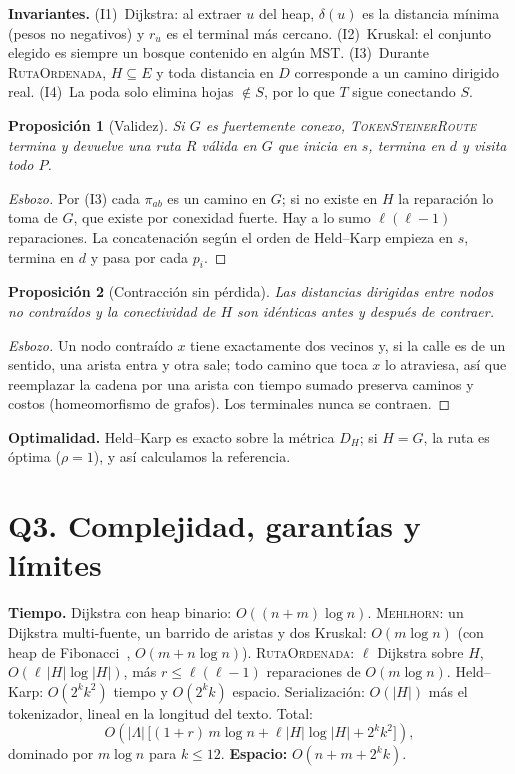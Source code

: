 \documentclass[conference,10pt]{IEEEtran}
\newtheorem{proposition}{Proposición}
\newcommand{\Sterm}{S}
\begin{document}
\textbf{Invariantes.} (I1)~Dijkstra: al extraer $u$ del heap, $\delta(u)$ es la distancia mínima (pesos no negativos) y $r_u$ es el terminal más cercano. (I2)~Kruskal: el conjunto elegido es siempre un bosque contenido en algún MST. (I3)~Durante \textsc{RutaOrdenada}, $H\subseteq E$ y toda distancia en $D$ corresponde a un camino dirigido real. (I4)~La poda solo elimina hojas $\notin\Sterm$, por lo que $T$ sigue conectando $\Sterm$.

\begin{proposition}[Validez]
Si $G$ es fuertemente conexo, \textsc{TokenSteinerRoute} termina y devuelve una ruta $R$ válida en $G$ que inicia en $s$, termina en $d$ y visita todo $P$.
\end{proposition}
\begin{proof}[Esbozo]
Por (I3) cada $\pi_{ab}$ es un camino en $G$; si no existe en $H$ la reparación lo toma de $G$, que existe por conexidad fuerte. Hay a lo sumo $\ell(\ell-1)$ reparaciones. La concatenación según el orden de Held--Karp empieza en $s$, termina en $d$ y pasa por cada $p_i$.
\end{proof}

\begin{proposition}[Contracción sin pérdida]
Las distancias dirigidas entre nodos no contraídos y la conectividad de $H$ son idénticas antes y después de contraer.
\end{proposition}
\begin{proof}[Esbozo]
Un nodo contraído $x$ tiene exactamente dos vecinos y, si la calle es de un sentido, una arista entra y otra sale; todo camino que toca $x$ lo atraviesa, así que reemplazar la cadena por una arista con tiempo sumado preserva caminos y costos (homeomorfismo de grafos). Los terminales nunca se contraen.
\end{proof}

\textbf{Optimalidad.} Held--Karp es exacto sobre la métrica $D_H$; si $H=G$, la ruta es óptima ($\rho=1$), y así calculamos la referencia.

\section{Q3. Complejidad, garantías y límites}
\textbf{Tiempo.} Dijkstra con heap binario: $O((n+m)\log n)$. \textsc{Mehlhorn}: un Dijkstra multi-fuente, un barrido de aristas y dos Kruskal: $O(m\log n)$ (con heap de Fibonacci~\cite{fredman1987}, $O(m+n\log n)$). \textsc{RutaOrdenada}: $\ell$ Dijkstra sobre $H$, $O(\ell\,|H|\log|H|)$, más $r\le\ell(\ell-1)$ reparaciones de $O(m\log n)$. Held--Karp: $O(2^k k^2)$ tiempo y $O(2^k k)$ espacio. Serialización: $O(|H|)$ más el tokenizador, lineal en la longitud del texto. Total:
\[
O\!\left(|\Lambda|\,\big[(1+r)\,m\log n+\ell|H|\log|H| + 2^k k^2\big]\right),
\]
dominado por $m\log n$ para $k\le 12$. \textbf{Espacio:} $O(n+m+2^k k)$.
\end{document}
